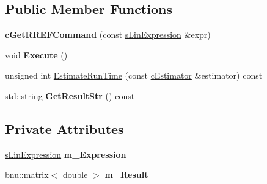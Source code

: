 \subsection*{Public Member Functions}
\begin{DoxyCompactItemize}
\item 
\hypertarget{classengine_1_1cGetRREFCommand_a5eff470afe650d5ed4ca5b5e20d158b8}{{\bfseries c\-Get\-R\-R\-E\-F\-Command} (const \hyperlink{structengine_1_1sLinExpression}{s\-Lin\-Expression} \&expr)}\label{classengine_1_1cGetRREFCommand_a5eff470afe650d5ed4ca5b5e20d158b8}

\item 
\hypertarget{classengine_1_1cGetRREFCommand_af31735b5a154fe9ab5c850ac2f9e6bcc}{void {\bfseries Execute} ()}\label{classengine_1_1cGetRREFCommand_af31735b5a154fe9ab5c850ac2f9e6bcc}

\item 
unsigned int \hyperlink{classengine_1_1cGetRREFCommand_ac2bf1ab437a8e977986c73f5cd85ac3c}{Estimate\-Run\-Time} (const \hyperlink{classengine_1_1cEstimator}{c\-Estimator} \&estimator) const 
\item 
\hypertarget{classengine_1_1cGetRREFCommand_ac34b0e92874d926f91d4f17587fb0e4d}{std\-::string {\bfseries Get\-Result\-Str} () const }\label{classengine_1_1cGetRREFCommand_ac34b0e92874d926f91d4f17587fb0e4d}

\end{DoxyCompactItemize}
\subsection*{Private Attributes}
\begin{DoxyCompactItemize}
\item 
\hypertarget{classengine_1_1cGetRREFCommand_a65bbc8e49e68c64baa8536351eef856e}{\hyperlink{structengine_1_1sLinExpression}{s\-Lin\-Expression} {\bfseries m\-\_\-\-Expression}}\label{classengine_1_1cGetRREFCommand_a65bbc8e49e68c64baa8536351eef856e}

\item 
\hypertarget{classengine_1_1cGetRREFCommand_aabd97349311c475cc70390a176fd662f}{bnu\-::matrix$<$ double $>$ {\bfseries m\-\_\-\-Result}}\label{classengine_1_1cGetRREFCommand_aabd97349311c475cc70390a176fd662f}

\end{DoxyCompactItemize}



